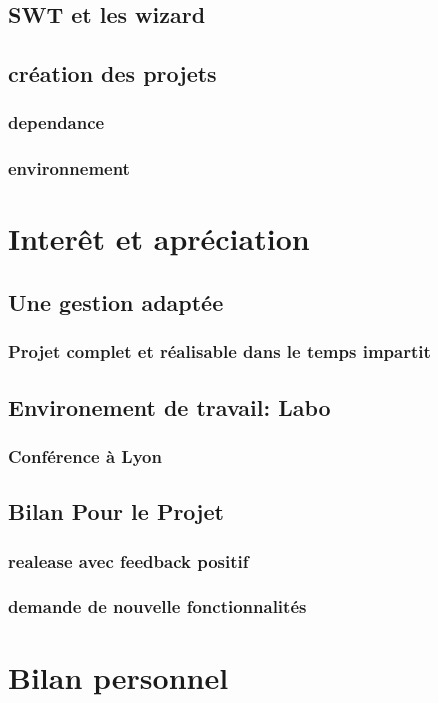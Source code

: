 \documentclass{article}
\begin{document}
    \subsection{SWT et les wizard}
    \subsection{création des projets}
        \subsubsection{dependance}
        \subsubsection{environnement}
        
\section{Interêt et apréciation}
    \subsection{Une gestion adaptée}
        \subsubsection{Projet complet et réalisable dans le temps impartit}
    \subsection{Environement de travail: Labo}
        \subsubsection{Conférence à Lyon}
    \subsection{Bilan Pour le Projet}
        \subsubsection{realease avec feedback positif}
        \subsubsection{demande de nouvelle fonctionnalités}
        
\section{Bilan personnel}
\end{document}
